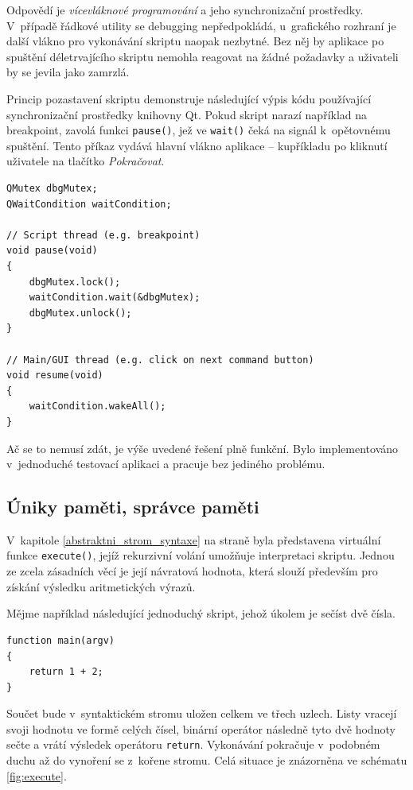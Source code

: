 \documentclass[11pt,twoside,a4paper]{book}
\begin{document}
Odpovědí je \textit{vícevláknové programování} a jeho synchronizační prostředky. V~případě řádkové utility se debugging nepředpokládá, u~grafického rozhraní je další vlákno pro vykonávání skriptu naopak nezbytné. Bez něj by aplikace po spuštění déletrvajícího skriptu nemohla reagovat na žádné požadavky a uživateli by se jevila jako zamrzlá.

Princip pozastavení skriptu demonstruje následující výpis kódu používající synchronizační prostředky knihovny Qt. Pokud skript narazí například na breakpoint, zavolá funkci \texttt{pause()}, jež ve \texttt{wait()} čeká na signál k~opětovnému spuštění. Tento příkaz vydává hlavní vlákno aplikace -- kupříkladu po kliknutí uživatele na tlačítko \textit{Pokračovat}.

\begin{verbatim}
QMutex dbgMutex;
QWaitCondition waitCondition;

// Script thread (e.g. breakpoint)
void pause(void)
{
    dbgMutex.lock();
    waitCondition.wait(&dbgMutex);
    dbgMutex.unlock();
}

// Main/GUI thread (e.g. click on next command button)
void resume(void)
{
    waitCondition.wakeAll();
}
\end{verbatim}

Ač se to nemusí zdát, je výše uvedené řešení plně funkční. Bylo implementováno v~jednoduché testovací aplikaci a pracuje bez jediného problému.


\subsection{Úniky paměti, správce paměti}

V~kapitole \ref{abstraktni_strom_syntaxe} na straně \pageref{abstraktni_strom_syntaxe} byla představena virtuální funkce \texttt{execute()}, jejíž rekurzivní volání umožňuje interpretaci skriptu. Jednou ze zcela zásadních věcí je její návratová hodnota, která slouží především pro získání výsledku aritmetických výrazů.

Mějme například následující jednoduchý skript, jehož úkolem je sečíst dvě čísla.

\begin{verbatim}
function main(argv)
{
    return 1 + 2;
}
\end{verbatim}

Součet bude v~syntaktickém stromu uložen celkem ve třech uzlech. Listy vracejí svoji hodnotu ve formě celých čísel, binární operátor následně tyto dvě hodnoty sečte a vrátí výsledek operátoru \texttt{return}. Vykonávání pokračuje v~podobném duchu až do vynoření se z~kořene stromu. Celá situace je znázorněna ve schématu \ref{fig:execute}.
\end{document}
